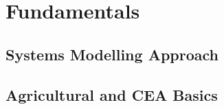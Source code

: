 \chapter{Fundamentals}
\label{chap:fundamentals}

\section{Systems Modelling Approach}
\section{Agricultural and CEA Basics}
%
